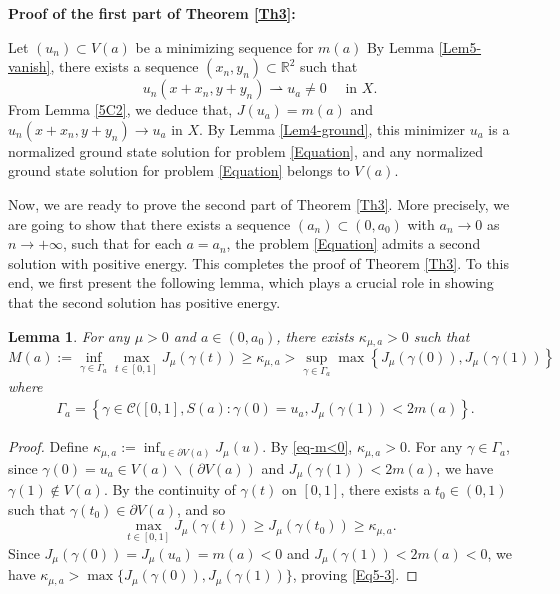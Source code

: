 \documentclass[11pt]{amsart}
\newtheorem{lemma}[theorem]{Lemma}
\numberwithin{equation}{section}
\begin{document}
{{\noindent \textbf{Proof of the first part of Theorem \ref{Th3}:}
{Let $ (u_n)\subset V(a) $  be a minimizing sequence for $m(a)$
By Lemma \ref{Lem5-vanish}, there exists a sequence $(x_n,y_n) \subset \mathbb{R}^2$ such that
\begin{equation}\label{Eq-weaku}
    u_n\left(x+x_n,y+y_n\right) \rightharpoonup u_a \neq 0 \quad \text { in } X .
\end{equation}
From Lemma \ref{5C2}, we deduce that, $J({u}_a)=m(a)$ and $u_n\left(x+x_n,y+y_n\right) \to {u}_a$ in $X$.
 By Lemma \ref{Lem4-ground}, this minimizer $u_a$ is a normalized ground state solution for problem \eqref{Equation},  and any normalized ground state solution for problem \eqref{Equation}  belongs to $V(a)$.

{Now, we are ready to prove the second part of Theorem \ref{Th3}. More precisely, we are going to show that there exists a sequence $(a_n) \subset (0, a_0)$ with $a_n \to 0$ as $n \to +\infty$, such that for each $a = a_n$, the problem \eqref{Equation} admits a second solution with positive energy. This completes the proof of Theorem \ref{Th3}. To this end, we first present the following lemma, which plays a crucial role in showing that the second solution has positive energy.}

\begin{lemma}\label{Mp}
    For any $\mu>0$ and $a \in\left(0, a_0\right)$, there exists $\kappa_{\mu, a}>0$ such that
    \begin{equation}\label{Eq5-3}
        M(a):=\inf _{\gamma \in \Gamma_{ a}} \max _{t \in[0,1]} J_\mu(\gamma(t)) \geq \kappa_{\mu,a}>\sup _{\gamma \in \Gamma_{ a}} \max \left\{J_\mu(\gamma(0)), J_\mu(\gamma(1))\right\}
    \end{equation}
    where
    \begin{equation}\label{Eq5-Gamma}
        \begin{aligned}
            &\Gamma_{ a}=\left\{\gamma \in \mathcal{C}([0,1], {S}(a): \gamma(0)=u_a, J_\mu(\gamma(1))<2 m(a)\right\} .
        \end{aligned}
    \end{equation}
\end{lemma}
\begin{proof}
    {Define  $\kappa_{\mu,a}:=\inf _{u \in \partial V(a)} J_\mu(u)$. By \eqref{eq-m<0}, $\kappa_{\mu,a}>0$. For any $\gamma \in \Gamma_{ a}$, since $\gamma(0)=u_a \in V(a) \backslash(\partial V(a))$ and $J_\mu(\gamma(1))<2 m(a)$, we have  $\gamma(1) \notin V(a)$. By the continuity of $\gamma(t)$ on $[0,1]$, there exists a $t_0 \in(0,1)$ such that $\gamma\left(t_0\right) \in \partial V(a)$, and so
 $$
 \max _{t \in[0,1]} J_\mu(\gamma(t)) \geq  J_\mu(\gamma(t_0))\geq\kappa_{\mu,a}.
 $$
 Since $J_\mu(\gamma(0)) = J_\mu(u_a) = m(a) < 0$ and $J_\mu(\gamma(1)) < 2 m(a) < 0$, we have $\kappa_{\mu,a} > \max \{ J_\mu(\gamma(0)), J_\mu(\gamma(1)) \}$, proving \eqref{Eq5-3}.}
\end{proof}

}}}
\end{document}
